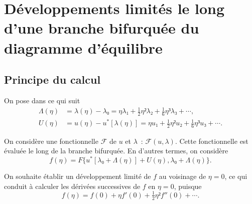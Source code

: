\documentclass[12pt, final]{scrartcl}
\theoremstyle{definition}
\begin{document}
\section{Développements limités le long d'une branche bifurquée du diagramme d'équilibre}

\subsection{Principe du calcul}
\label{sec:20220107121442}
%

On pose dans ce qui suit
\begin{align}
  \label{eq:20211112155446}
  Λ(η) & = λ(η) - λ₀ = η λ₁ + \tfrac{1}{2} η² λ₂ + \tfrac{1}{6} η³ λ₃ + \cdots,\\
  \label{eq:20211112113028}
  U(η) & = u(η) - u^{\ast}[λ(η)] = η u₁ + \tfrac{1}{2} η² u₂ + \tfrac{1}{6} η³ u₃ + \cdots.
\end{align}

On considère une fonctionnelle \(\mathcal{F}\) de \(u\) et \(λ\)~:
\(\mathcal{F}(u, λ)\). Cette fonctionnelle est évaluée le long de la branche
bifurquée. En d'autres termes, on considère
\begin{equation*}
  f(η) = F\{ u^{\ast} [λ₀ + Λ(η)] + U(η), λ₀ + Λ(η) \}.
\end{equation*}

On souhaite établir un développement limité de \(f\) au voisinage de \(η = 0\),
ce qui conduit à calculer les dérivées successives de \(f\) en \(η = 0\),
puisque
\begin{equation*}
  f(η) = f(0) + η f'(0) + \tfrac{1}{2} η² f''(0) + \cdots.
\end{equation*}
\end{document}
